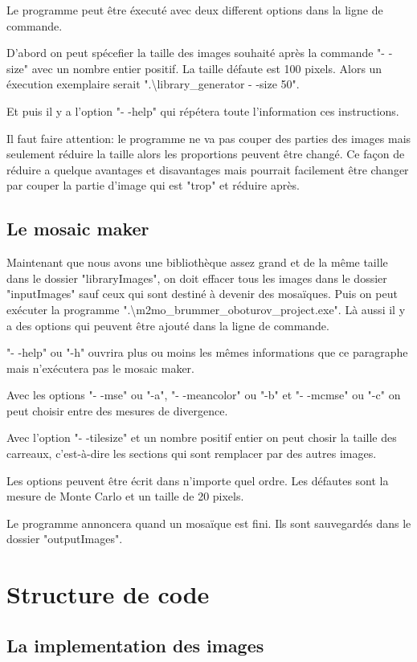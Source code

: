 \documentclass[a4paper]{article}
\begin{document}
 Le programme peut \^etre \'execut\'e avec deux different options dans la ligne de commande.
 
 D'abord on peut sp\'ecefier la taille des images souhait\'e apr\`es la commande "- -size" avec un nombre entier positif.
 La taille d\'efaute est 100 pixels.
Alors un \'execution exemplaire serait ".\textbackslash library\_generator - -size 50".

Et puis il y a l'option "- -help" qui r\'ep\'etera toute l'information ces instructions.

Il faut faire attention: le programme ne va pas couper des parties des images mais seulement r\'eduire la taille alors les proportions peuvent \^etre chang\'e.
Ce fa\c{c}on de r\'eduire a quelque avantages et disavantages mais pourrait facilement \^etre changer par couper la partie d'image qui est "trop" et r\'eduire apr\`es.

\subsection{Le mosaic maker}
Maintenant que nous avons une biblioth\`eque assez grand et de la m\^eme taille dans le dossier "libraryImages", on doit effacer tous les images dans le dossier "inputImages" sauf ceux qui sont destin\'e \`a devenir des mosa\"iques.
Puis on peut ex\'ecuter la programme ".\textbackslash m2mo\_brummer\_oboturov\_project.exe".
L\`a aussi il y a des options qui peuvent \^etre ajout\'e dans la ligne de commande.

"- -help" ou "-h" ouvrira plus ou moins les m\^emes informations que ce paragraphe mais n'ex\'ecutera pas le mosaic maker.

Avec les options "- -mse" ou "-a", "- -meancolor" ou "-b" et "- -mcmse" ou "-c" on peut choisir entre des mesures de divergence.

Avec l'option "- -tilesize" et un nombre positif entier on peut chosir la taille des carreaux, c'est-\`a-dire les sections qui sont remplacer par des autres images.

Les options peuvent \^etre \'ecrit dans n'importe quel ordre.
Les d\'efautes sont la mesure de Monte Carlo et un taille de 20 pixels.

Le programme annoncera quand un mosa\"ique est fini.
 Ils sont sauvegard\'es dans le dossier "outputImages". 
\section{Structure de code}
\subsection{La implementation des images}
\end{document}
